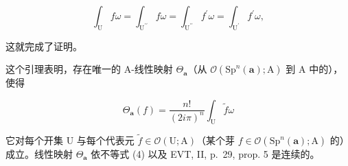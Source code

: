 \[
\int_ {\mathrm{U}} f \omega = \int_ {\mathrm {U^ {\prime\prime}}} f \omega = \int_ {\mathrm {U^ {\prime\prime}}} f ^ {\prime} \omega = \int_ {\mathrm {U^ {\prime}}} f ^ {\prime} \omega ,
\]

这就完成了证明。

这个引理表明，存在唯一的 A-线性映射 \(\Theta_{\boldsymbol{a}}\)（从 \(\mathcal{O}(\mathrm{Sp}^{n}(\boldsymbol{a});\mathrm{A})\) 到 A 中的），使得

\[
\Theta_ {\boldsymbol {a}} (f) = \frac {n !}{(2 i \pi) ^ {n}} \int_ {\mathrm{U}} \widetilde {f} \omega\tag{5}
\]

它对每个开集 U 与每个代表元 \(\tilde{f} \in \mathcal{O}(\mathrm{U};\mathrm{A})\)（某个芽 \(f \in \mathcal{O}(\mathrm{Sp}^n (\boldsymbol {a});\mathrm{A})\) 的）成立。线性映射 \(\Theta_{\boldsymbol{a}}\) 依不等式 (4) 以及 EVT, II, p.~29, prop. 5 是连续的。
\relax{}

